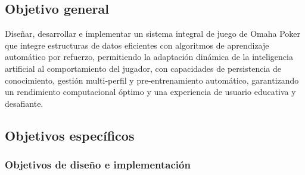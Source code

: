 \documentclass[12pt,a4paper]{article}
\begin{document}
\subsection{Objetivo general}

Diseñar, desarrollar e implementar un sistema integral de juego de Omaha Poker que integre estructuras de datos eficientes con algoritmos de aprendizaje automático por refuerzo, permitiendo la adaptación dinámica de la inteligencia artificial al comportamiento del jugador, con capacidades de persistencia de conocimiento, gestión multi-perfil y pre-entrenamiento automático, garantizando un rendimiento computacional óptimo y una experiencia de usuario educativa y desafiante.

\subsection{Objetivos específicos}

\subsubsection{Objetivos de diseño e implementación}
\end{document}
